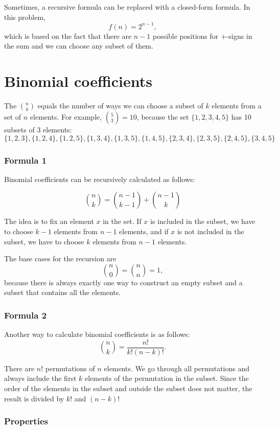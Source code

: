 Sometimes, a recursive formula can be replaced
with a closed-form formula.
In this problem,
\[
f(n)=2^{n-1},
\]
which is based on the fact that there are $n-1$
possible positions for +-signs in the sum
and we can choose any subset of them.

\section{Binomial coefficients}


The  $\binom{n}{k}$
equals the number of ways we can choose a subset
of $k$ elements from a set of $n$ elements.
For example, $\binom{5}{3}=10$,
because the set $\{1,2,3,4,5\}$
has 10 subsets of 3 elements:
\[ \{1,2,3\}, \{1,2,4\}, \{1,2,5\}, \{1,3,4\}, \{1,3,5\}, 
\{1,4,5\}, \{2,3,4\}, \{2,3,5\}, \{2,4,5\}, \{3,4,5\} \]

\subsubsection{Formula 1}

Binomial coefficients can be
recursively calculated as follows:

\[
\binom{n}{k} = \binom{n-1}{k-1} + \binom{n-1}{k}
\]

The idea is to fix an element $x$ in the set.
If $x$ is included in the subset,
we have to choose $k-1$
elements from $n-1$ elements,
and if $x$ is not included in the subset,
we have to choose $k$ elements from $n-1$ elements.

The base cases for the recursion are
\[
\binom{n}{0} = \binom{n}{n} = 1,
\]
because there is always exactly
one way to construct an empty subset
and a subset that contains all the elements.

\subsubsection{Formula 2}

Another way to calculate binomial coefficients is as follows:
\[
\binom{n}{k} = \frac{n!}{k!(n-k)!}.
\]

There are $n!$ permutations of $n$ elements.
We go through all permutations and always
include the first $k$ elements of the permutation
in the subset.
Since the order of the elements in the subset
and outside the subset does not matter,
the result is divided by $k!$ and $(n-k)!$

\subsubsection{Properties}

